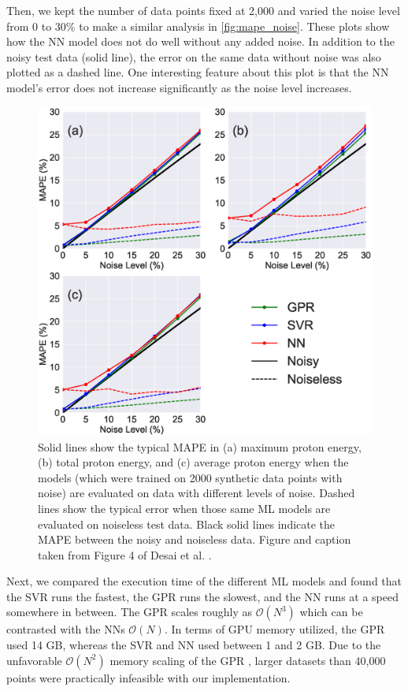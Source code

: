 Then, we kept the number of data points fixed at 2,000 and varied the noise level from 0 to 30\% to make a similar analysis in \autoref{fig:mape_noise}. These plots show how the \gls{NN} model does not do well without any added noise. In addition to the noisy test data (solid line), the error on the same data without noise was also plotted as a dashed line. One interesting feature about this plot is that the \gls{NN} model's error does not increase significantly as the noise level increases. 

\begin{figure}
	\centering 
	\includegraphics[width=0.75\linewidth]{planning/images/paper1/test_mape_points=2.0k.eps}
	\caption{Solid lines show the typical MAPE in (a) maximum proton energy, (b) total proton energy, and (c) average proton energy when the models (which were trained on 2000 synthetic data points with noise) are evaluated on data with different levels of noise. Dashed lines show the typical error when those same ML models are evaluated on noiseless test data. Black solid lines indicate the MAPE between the noisy and noiseless data. Figure and caption taken from Figure 4 of Desai et al. \cite{Desai_2024_CPP}.}
	\label{fig:mape_noise}
\end{figure}

Next, we compared the execution time of the different \gls{ML} models and found that the \gls{SVR} runs the fastest, the \gls{GPR} runs the slowest, and the \gls{NN} runs at a speed somewhere in between. The \gls{GPR} scales roughly as $\mathcal{O}(N^3)$ \cite{Wang_2019_GPytorch} which can be contrasted with the \gls{NN}s $\mathcal{O}(N)$. In terms of GPU memory utilized, the \gls{GPR} used 14 GB, whereas the \gls{SVR} and \gls{NN} used between 1 and 2 GB. Due to the unfavorable $\mathcal{O}(N^2)$ memory scaling of the \gls{GPR} \cite{Wang_2019_GPytorch}, larger datasets than 40,000 points were practically infeasible with our implementation.

